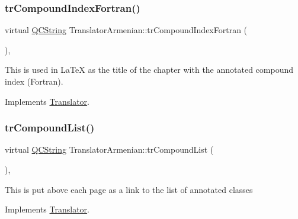 \mbox{\label{class_translator_armenian_a4059ef3f93e99ccd5520c1b80ee7575e}} 
\subsubsection{\texorpdfstring{trCompoundIndexFortran()}{trCompoundIndexFortran()}}
{\footnotesize\ttfamily virtual \mbox{\hyperlink{class_q_c_string}{Q\+C\+String}} Translator\+Armenian\+::tr\+Compound\+Index\+Fortran (\begin{DoxyParamCaption}{ }\end{DoxyParamCaption})\hspace{0.3cm}{\ttfamily [inline]}, {\ttfamily [virtual]}}

This is used in La\+TeX as the title of the chapter with the annotated compound index (Fortran). 

Implements \mbox{\hyperlink{class_translator}{Translator}}.

\mbox{\label{class_translator_armenian_a70d5660f4c115653a7f0c83653570a3a}} 
\subsubsection{\texorpdfstring{trCompoundList()}{trCompoundList()}}
{\footnotesize\ttfamily virtual \mbox{\hyperlink{class_q_c_string}{Q\+C\+String}} Translator\+Armenian\+::tr\+Compound\+List (\begin{DoxyParamCaption}{ }\end{DoxyParamCaption})\hspace{0.3cm}{\ttfamily [inline]}, {\ttfamily [virtual]}}

This is put above each page as a link to the list of annotated classes 

Implements \mbox{\hyperlink{class_translator}{Translator}}.

\mbox{\label{class_translator_armenian_a277a12a991f621569ba984039d65c23f}} 
